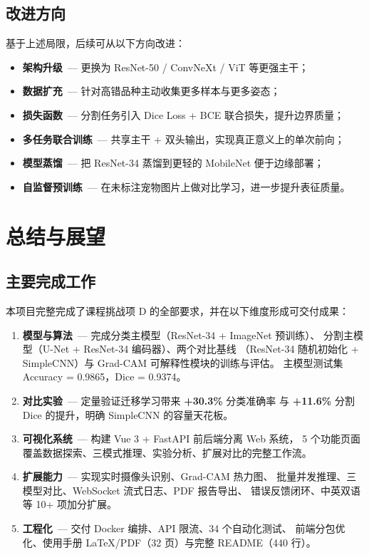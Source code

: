 \documentclass[12pt, a4paper, openany]{ctexbook}
\begin{document}
\section{改进方向}

基于上述局限，后续可从以下方向改进：

\begin{itemize}[leftmargin=*]
  \item \textbf{架构升级}\ — 更换为 ResNet-50 / ConvNeXt / ViT 等更强主干；
  \item \textbf{数据扩充}\ — 针对高错品种主动收集更多样本与更多姿态；
  \item \textbf{损失函数}\ — 分割任务引入 Dice Loss + BCE 联合损失，提升边界质量；
  \item \textbf{多任务联合训练}\ — 共享主干 + 双头输出，实现真正意义上的单次前向；
  \item \textbf{模型蒸馏}\ — 把 ResNet-34 蒸馏到更轻的 MobileNet 便于边缘部署；
  \item \textbf{自监督预训练}\ — 在未标注宠物图片上做对比学习，进一步提升表征质量。
\end{itemize}

\chapter{总结与展望}
\label{ch:conclusion}

\section{主要完成工作}

本项目完整完成了课程挑战项 D 的全部要求，并在以下维度形成可交付成果：

\begin{enumerate}[leftmargin=*]
  \item \textbf{模型与算法}\ — 完成分类主模型（ResNet-34 + ImageNet 预训练）、
        分割主模型（U-Net + ResNet-34 编码器）、两个对比基线
        （ResNet-34 随机初始化 + SimpleCNN）与 Grad-CAM 可解释性模块的训练与评估。
        主模型测试集 Accuracy = 0.9865，Dice = 0.9374。
  \item \textbf{对比实验}\ — 定量验证迁移学习带来 \textbf{+30.3\%} 分类准确率
        与 \textbf{+11.6\%} 分割 Dice 的提升，明确 SimpleCNN 的容量天花板。
  \item \textbf{可视化系统}\ — 构建 Vue 3 + FastAPI 前后端分离 Web 系统，
        5 个功能页面覆盖数据探索、三模式推理、实验分析、扩展对比的完整工作流。
  \item \textbf{扩展能力}\ — 实现实时摄像头识别、Grad-CAM 热力图、
        批量并发推理、三模型对比、WebSocket 流式日志、PDF 报告导出、
        错误反馈闭环、中英双语等 10+ 项加分扩展。
  \item \textbf{工程化}\ — 交付 Docker 编排、API 限流、34 个自动化测试、
        前端分包优化、使用手册 LaTeX/PDF（32 页）与完整 README（440 行）。
\end{enumerate}
\end{document}
